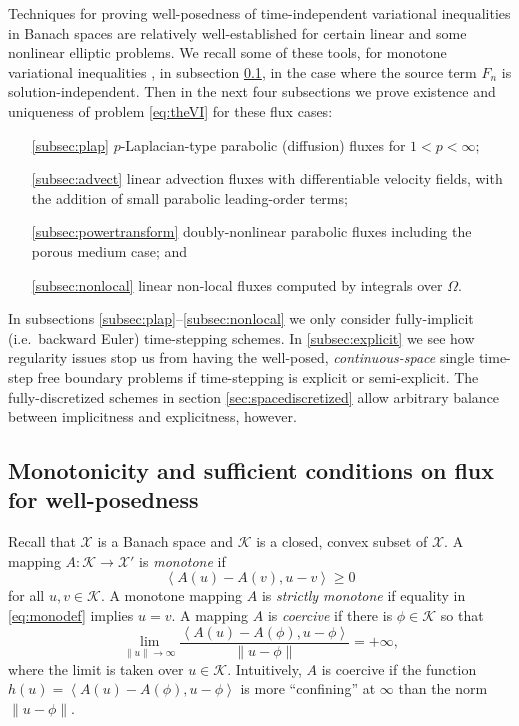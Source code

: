\documentclass[final,leqno,onefignum,onetabnum]{siamltex1213bueler}
\newcommand{\ip}[2]{\ensuremath{\left<#1,#2\right>}}
\begin{document}
Techniques for proving well-posedness of time-independent variational inequalities in Banach spaces are relatively well-established for certain linear and some nonlinear elliptic problems.  We recall some of these tools, for monotone variational inequalities \cite{KinderlehrerStampacchia1980}, in subsection \ref{subsec:mono}, in the case where the source term $F_n$ is solution-independent.  Then in the next four subsections we prove existence and uniqueness of problem \eqref{eq:theVI} for these flux cases:
\begin{itemize}
\item[\ref{subsec:plap}] $p$-Laplacian-type parabolic (diffusion) fluxes for $1<p<\infty$;
\item[\ref{subsec:advect}] linear advection fluxes with differentiable velocity fields, with the addition of small parabolic leading-order terms;
\item[\ref{subsec:powertransform}] doubly-nonlinear parabolic fluxes including the porous medium case; and
\item[\ref{subsec:nonlocal}] linear non-local fluxes computed by integrals over $\Omega$.
\end{itemize}
In subsections \ref{subsec:plap}--\ref{subsec:nonlocal} we only consider fully-implicit (i.e.~backward Euler) time-stepping schemes.  In \ref{subsec:explicit} we see how regularity issues stop us from having the well-posed, \emph{continuous-space} single time-step free boundary problems if time-stepping is explicit or semi-explicit.  The fully-discretized schemes in section \ref{sec:spacediscretized} allow arbitrary balance between implicitness and explicitness, however.

\subsection{Monotonicity and sufficient conditions on flux for well-posedness} \label{subsec:mono}  Recall that $\mathcal{X}$ is a Banach space and $\mathcal{K}$ is a closed, convex subset of $\mathcal{X}$.  A mapping $A : \mathcal{K} \to \mathcal{X}'$ is \emph{monotone} \cite{KinderlehrerStampacchia1980} if
\begin{equation}
   \ip{A(u) - A(v)}{u-v} \ge 0  \label{eq:monodef}
\end{equation}
for all $u,v\in\mathcal{K}$.  A monotone mapping $A$ is \emph{strictly monotone} if equality in \eqref{eq:monodef} implies $u=v$.  A mapping $A$ is \emph{coercive} \cite{KinderlehrerStampacchia1980} if there is $\phi\in \mathcal{K}$ so that
\begin{equation}
   \lim_{\|u\|\to\infty} \frac{\ip{A(u) - A(\phi)}{u-\phi}}{\|u-\phi\|} = +\infty, \label{eq:coercivedef}
\end{equation}
where the limit is taken over $u\in\mathcal{K}$.  Intuitively, $A$ is coercive if the function $h(u)=\ip{A(u) - A(\phi)}{u-\phi}$ is more ``confining'' at $\infty$ than the norm $\|u-\phi\|$.
\end{document}
